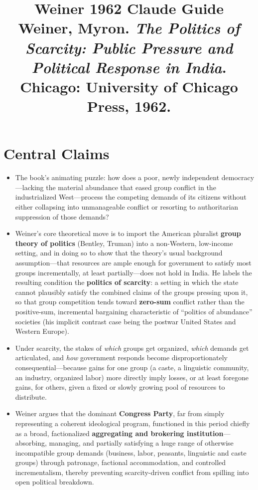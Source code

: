 \documentclass[12pt]{article}
\title{\textbf{Weiner 1962 Claude Guide}\\
\large Weiner, Myron. \textit{The Politics of Scarcity: Public Pressure and Political Response in India}.\\
Chicago: University of Chicago Press, 1962.}
\author{}
\date{}
\begin{document}
\maketitle
\tableofcontents
\newpage

\section{Central Claims}

\begin{itemize}[leftmargin=*, itemsep=4pt]
    \item The book's animating puzzle: how does a poor, newly independent democracy---lacking the material abundance that eased group conflict in the industrialized West---process the competing demands of its citizens without either collapsing into unmanageable conflict or resorting to authoritarian suppression of those demands?
    \item Weiner's core theoretical move is to import the American pluralist \textbf{group theory of politics} (Bentley, Truman) into a non-Western, low-income setting, and in doing so to show that the theory's usual background assumption---that resources are ample enough for government to satisfy most groups incrementally, at least partially---does not hold in India. He labels the resulting condition the \textbf{politics of scarcity}: a setting in which the state cannot plausibly satisfy the combined claims of the groups pressing upon it, so that group competition tends toward \textbf{zero-sum} conflict rather than the positive-sum, incremental bargaining characteristic of ``politics of abundance'' societies (his implicit contrast case being the postwar United States and Western Europe).
    \item Under scarcity, the stakes of \emph{which} groups get organized, \emph{which} demands get articulated, and \emph{how} government responds become disproportionately consequential---because gains for one group (a caste, a linguistic community, an industry, organized labor) more directly imply losses, or at least foregone gains, for others, given a fixed or slowly growing pool of resources to distribute.
    \item Weiner argues that the dominant \textbf{Congress Party}, far from simply representing a coherent ideological program, functioned in this period chiefly as a broad, factionalized \textbf{aggregating and brokering institution}---absorbing, managing, and partially satisfying a huge range of otherwise incompatible group demands (business, labor, peasants, linguistic and caste groups) through patronage, factional accommodation, and controlled incrementalism, thereby preventing scarcity-driven conflict from spilling into open political breakdown.

\end{itemize}
\end{document}
